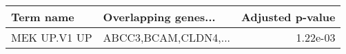 \begin{tabular}{llr}
\toprule
   Term name & Overlapping genes... &  Adjusted p-value \\
\midrule
MEK UP.V1 UP & ABCC3,BCAM,CLDN4,... &          1.22e-03 \\
\bottomrule
\end{tabular}
